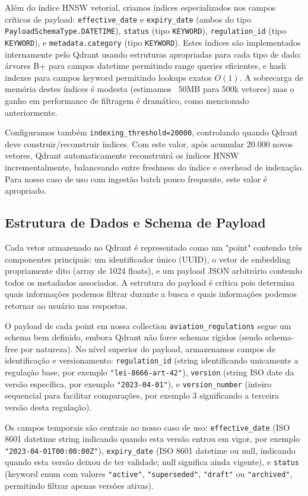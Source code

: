 \documentclass[12pt,a4paper]{article}
\begin{document}
Além do índice HNSW vetorial, criamos índices especializados nos campos críticos de payload: \texttt{effective\_date} e \texttt{expiry\_date} (ambos do tipo \texttt{PayloadSchemaType.DATETIME}), \texttt{status} (tipo \texttt{KEYWORD}), \texttt{regulation\_id} (tipo \texttt{KEYWORD}), e \texttt{metadata.category} (tipo \texttt{KEYWORD}). Estes índices são implementados internamente pelo Qdrant usando estruturas apropriadas para cada tipo de dado: árvores B+ para campos datetime permitindo range queries eficientes, e hash indexes para campos keyword permitindo lookups exatos $O(1)$. A sobrecarga de memória destes índices é modesta (estimamos ~50MB para 500k vetores) mas o ganho em performance de filtragem é dramático, como mencionado anteriormente.

Configuramos também \texttt{indexing\_threshold=20000}, controlando quando Qdrant deve construir/reconstruir índices. Com este valor, após acumular 20.000 novos vetores, Qdrant automaticamente reconstruirá os índices HNSW incrementalmente, balanceando entre freshness do índice e overhead de indexação. Para nosso caso de uso com ingestão batch pouco frequente, este valor é apropriado.

\subsection{Estrutura de Dados e Schema de Payload}

Cada vetor armazenado no Qdrant é representado como um "point" contendo três componentes principais: um identificador único (UUID), o vetor de embedding propriamente dito (array de 1024 floats), e um payload JSON arbitrário contendo todos os metadados associados. A estrutura do payload é crítica pois determina quais informações podemos filtrar durante a busca e quais informações podemos retornar ao usuário nas respostas.

O payload de cada point em nossa collection \texttt{aviation\_regulations} segue um schema bem definido, embora Qdrant não force schemas rígidos (sendo schema-free por natureza). No nível superior do payload, armazenamos campos de identificação e versionamento: \texttt{regulation\_id} (string identificando unicamente a regulação base, por exemplo \texttt{"lei-8666-art-42"}), \texttt{version} (string ISO date da versão específica, por exemplo \texttt{"2023-04-01"}), e \texttt{version\_number} (inteiro sequencial para facilitar comparações, por exemplo 3 significando a terceira versão desta regulação).

Os campos temporais são centrais ao nosso caso de uso: \texttt{effective\_date} (ISO 8601 datetime string indicando quando esta versão entrou em vigor, por exemplo \texttt{"2023-04-01T00:00:00Z"}), \texttt{expiry\_date} (ISO 8601 datetime ou null, indicando quando esta versão deixou de ter validade; null significa ainda vigente), e \texttt{status} (keyword enum com valores \texttt{"active"}, \texttt{"superseded"}, \texttt{"draft"} ou \texttt{"archived"}, permitindo filtrar apenas versões ativas).
\end{document}
